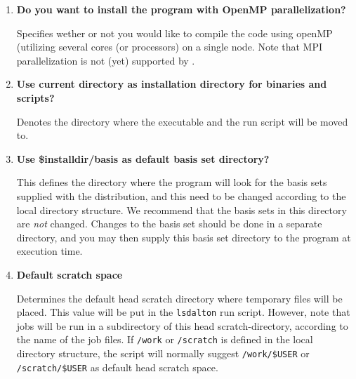 \begin{enumerate}

\item {\bf Do you want to install the program with OpenMP parallelization?}

Specifies wether or not you would like to compile the code using openMP (utilizing
several cores (or processors) on a single node.
Note that MPI parallelization
is not (yet) supported by {\lsdalton}.

%
%
%

\item {\bf Use current directory as installation directory for binaries and scripts?}

Denotes the directory where the executable and the
run script will be moved to.

\item {\bf Use \$installdir/basis as default basis set directory?}

This defines the directory where the program will look for the
basis sets supplied with the distribution, and this need to be
changed according to the local directory structure. We recommend
that the basis sets in this directory are {\em not} changed.
Changes to the basis set should be done in a separate
directory, and you may then supply this basis set directory to the program
at execution time.

\item {\bf Default scratch space}

Determines the default head scratch
directory where temporary files will be placed. This value will be put
in the \verb|lsdalton| run script. However, note that jobs will be run in
a subdirectory of this head scratch-directory, according to the name
of the job files. If \verb|/work| or \verb|/scratch| is defined in the
local directory structure, the script will normally suggest
\verb|/work/$USER| or \verb|/scratch/$USER| as default head scratch space.

\end{enumerate}

